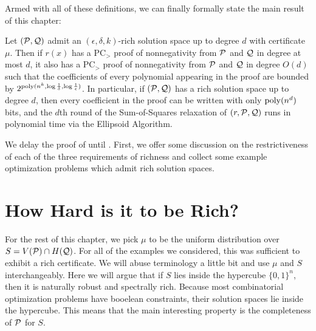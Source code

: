 Armed with all of these definitions, we can finally formally state the main result of this chapter:
\begin{theorem}\label{thm:bit_complexity-main}
Let $(\mathcal P, \mathcal Q)$ admit an $(\epsilon,\delta,k)$-rich solution space up to degree $d$ with certificate $\mu$. Then if $r(x)$ has a PC$_>$ proof of nonnegativity from $\mathcal P$ and $\mathcal Q$ in degree at most $d$, it also has a PC$_>$ proof of nonnegativity from $\mathcal P$ and $\mathcal Q$ in degree $O(d)$ such that the coefficients of every polynomial appearing in the proof are bounded by $2^{\operatorname{poly}(n^k, \log \frac{1}{\delta}, \log \frac{1}{\epsilon})}$. In particular, if $(\mathcal P,\mathcal Q)$ has a rich solution space up to degree $d$, then every coefficient in the proof can be written with only $\operatorname{poly}(n^d)$ bits, and the $d$th round of the Sum-of-Squares relaxation of $(r, \mathcal P, \mathcal Q)$ runs in polynomial time via the Ellipsoid Algorithm.
\end{theorem}

We delay the proof of  until . First, we offer some discussion on the restrictiveness of each of the three requirements of richness and collect some example optimization problems which admit rich solution spaces.

\section{How Hard is it to be Rich?}
For the rest of this chapter, we pick $\mu$ to be the uniform distribution over $S = V(\mathcal P) \cap H(\mathcal Q)$. For all of the examples we considered, this was sufficient to exhibit a rich certificate. We will abuse terminology a little bit and use $\mu$ and $S$ interchangeably. Here we will argue that if $S$ lies inside the hypercube $\{0,1\}^n$, then it is naturally robust and spectrally rich. Because most combinatorial optimization problems have booelean constraints, their solution spaces lie inside the hypercube. This means that the main interesting property is the completeness of $\mathcal P$ for $S$.
